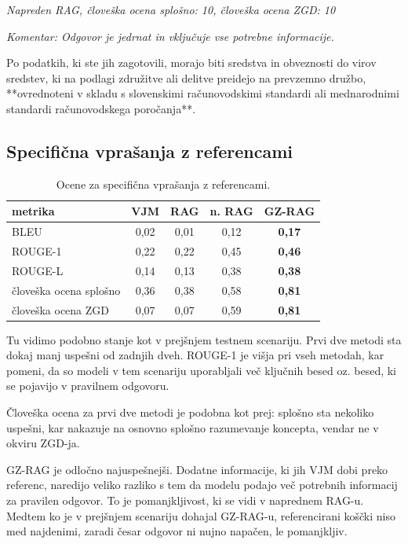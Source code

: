\documentclass[a4paper,12pt,openright]{book}
\begin{document}
\textit{Napreden RAG, človeška ocena splošno: 10, človeška ocena ZGD: 10}

\textit{Komentar: Odgovor je jedrnat in vključuje vse potrebne informacije.}

\begin{mdframed}[linewidth=1pt]
    \raggedright
    \ttfamily
    Po podatkih, ki ste jih zagotovili, morajo biti sredstva in obveznosti do virov sredstev, ki na podlagi združitve ali delitve preidejo na prevzemno družbo, **ovrednoteni v skladu s slovenskimi računovodskimi standardi ali mednarodnimi standardi računovodskega poročanja**.
\end{mdframed}

\subsection{Specifična vprašanja z referencami}

\begin{table}[H]
\centering
\caption{Ocene za specifična vprašanja z referencami.}
\begin{tabular}{|l|c|c|c|c|}
\hline
metrika  & VJM & RAG & n. RAG & GZ-RAG \\ \hline
BLEU           & 0,02     & 0,01     & 0,12     & \textbf{0,17}     \\ \hline
ROUGE-1        & 0,22     & 0,22     & 0,45     & \textbf{0,46}     \\ \hline
ROUGE-L        & 0,14     & 0,13     & 0,38     & \textbf{0,38}     \\ \hline
človeška ocena splošno & 0,36     & 0,38     & 0,58     & \textbf{0,81}     \\ \hline
človeška ocena ZGD & 0,07     & 0,07     & 0,59     & \textbf{0,81}     \\ \hline
\end{tabular}
\end{table}

Tu vidimo podobno stanje kot v prejšnjem testnem scenariju. Prvi dve metodi sta dokaj manj uspešni od zadnjih dveh. ROUGE-1 je višja pri vseh metodah, kar pomeni, da so modeli v tem scenariju uporabljali več ključnih besed oz. besed, ki se pojavijo v pravilnem odgovoru.

Človeška ocena za prvi dve metodi je podobna kot prej: splošno sta nekoliko uspešni, kar nakazuje na osnovno splošno razumevanje koncepta, vendar ne v okviru ZGD-ja.

GZ-RAG je odločno najuspešnejši. Dodatne informacije, ki jih VJM dobi preko referenc, naredijo veliko razliko s tem da modelu podajo več potrebnih informacij za pravilen odgovor. To je pomanjkljivost, ki se vidi v naprednem RAG-u. Medtem ko je v prejšnjem scenariju dohajal GZ-RAG-u, referencirani koščki niso med najdenimi, zaradi česar odgovor ni nujno napačen, le pomanjkljiv.
\end{document}
